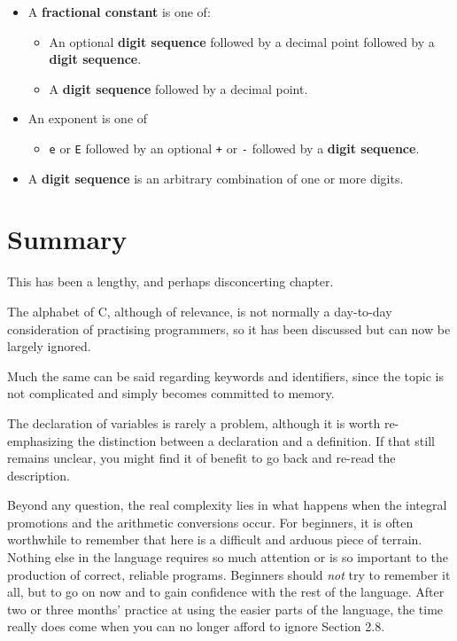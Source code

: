    \begin{itemize}
    \item A \textbf{fractional constant} is one of:
     \begin{itemize}
      \item An optional \textbf{digit sequence} followed by a decimal point
       followed by a \textbf{digit sequence}.
      \item A \textbf{digit sequence} followed by a decimal point.
     \end{itemize}
    

    \item An exponent is one of
     \begin{itemize}
      \item \texttt{e} or \texttt{E} followed by an
       optional \texttt{+} or \texttt{-} followed by a
       \textbf{digit sequence}.
     \end{itemize}
    

    \item A \textbf{digit sequence} is an arbitrary combination of one or more
     digits.
   \end{itemize}

  

 
        \section{Summary}
        


  This has been a lengthy, and perhaps disconcerting chapter.


  The alphabet of C, although of relevance, is not normally a
   day-to-day consideration of practising programmers, so it has been
   discussed but can now be largely ignored.


  Much the same can be said regarding keywords and identifiers, since the
   topic is not complicated and simply becomes committed to memory.


  The declaration of variables is rarely a problem, although it is worth
   re-emphasizing the distinction between a declaration and a definition. If
   that still remains unclear, you might find it of benefit to go back and
   re-read the description.


  Beyond any question, the real complexity lies in what happens when the
   integral promotions and the arithmetic conversions occur. For beginners, it
   is often worthwhile to remember that here is a difficult and arduous piece
   of terrain. Nothing else in the language requires so much attention or is
   so important to the production of correct, reliable programs. Beginners
   should \textit{not} try to remember it all, but to go on now and to gain
   confidence with the rest of the language. After two or three months'
   practice at using the easier parts of the language, the time really does
   come when you can no longer afford to ignore Section 2.8.


